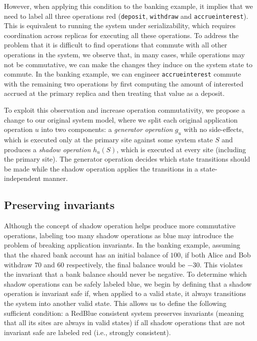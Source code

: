 However, when applying this condition to the banking example, it implies that we need to label all three operations red
({\tt deposit}, {\tt withdraw} and {\tt accrueinterest}).
This is equivalent to running the system under serializability, which requires coordination across replicas for executing all these operations.
To address the problem that it is difficult to find operations that commute with all other operations in the system, we observe that, in many cases,
while operations may not be commutative, we
can make the changes they induce on the system state to commute. In
the banking example, we can engineer {\tt accrueinterest} commute with the remaining two operations
by first computing the amount of interested accrued at the primary replica and then treating that value as a deposit.


To exploit this observation and increase operation commutativity, we propose a change to our
original system model,
where we split each original application operation $u$
into two components: a {\em generator operation} $g_u$ with no
side-effects, which is executed only at the primary site against some
system state $S$ and produces a {\em shadow operation} $h_u(S)$,
which is executed at every site (including the primary site). The
generator operation decides which state transitions should be made
while the shadow operation applies the transitions in a
state-indep\-endent manner.

\subsection{Preserving invariants}
Although the concept of shadow operation helps produce more commutative operations, labeling too many
shadow operations as blue may introduce the problem of breaking application invariants. In the banking example, assuming that the shared bank account has an initial balance of $100$, if both Alice and Bob withdraw $70$ and $60$ respectively,
the final balance would be $-30$. This violates the
invariant that a bank balance should never be negative. To determine which shadow 
operations can be safely labeled blue, we begin by defining that a
shadow operation is invariant safe if, when applied to a valid state, it always transitions
the system into another valid state. This allows us to define the following
sufficient condition: a RedBlue consistent system preserves invariants (meaning that all its sites are always in valid states) if all shadow operations that are not invariant safe are labeled red (i.e., strongly consistent).

